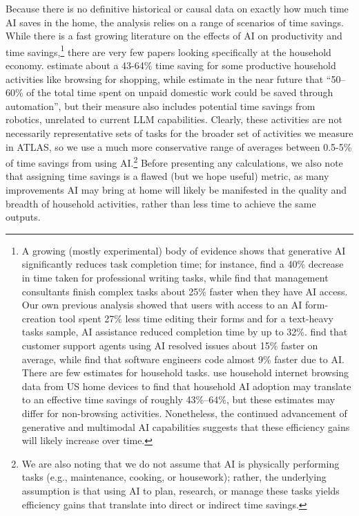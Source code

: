 \documentclass[11pt,a4paper]{article}
\begin{document}
Because there is no definitive historical or causal data on exactly how much time AI saves in the home, the analysis relies on a range of scenarios of time savings. While there is a fast growing literature on the effects of AI on productivity and time savings,\footnote{A growing (mostly experimental) body of evidence shows that generative AI significantly reduces task completion time; for instance, \cite{Noy2023} find a 40\% decrease in time taken for professional writing tasks, while \cite{DellAcqua2026} find that management consultants finish complex tasks about 25\% faster when they have AI access. Our own previous analysis \citep{strand_ai_at_work} showed that users with access to an AI form-creation tool spent 27\% less time editing their forms and for a text-heavy tasks sample, AI assistance reduced completion time by up to 32\%. \cite{Brynjolfsson2025} find that customer support agents using AI resolved issues about 15\% faster on average, while \cite{ChenStratton2026} find that software engineers code almost 9\% faster due to AI. There are few estimates for household tasks. \cite{blank2026householdimpactgenerativeai} use household internet browsing data from US home devices to find that household AI adoption may translate to an effective time savings of roughly 43\%--64\%, but these estimates may differ for non-browsing activities. Nonetheless, the continued advancement of generative and multimodal AI capabilities suggests that these efficiency gains will likely increase over time.} there are very few papers looking specifically at the household economy. \citet{blank2026householdimpactgenerativeai} estimate about a 43-64\% time saving for some productive household activities like browsing for shopping, while \citet{HERTOG2023122443} estimate in the near future that ``50--60\% of the total time spent on unpaid domestic work could be saved through automation'', but their measure also includes potential time savings from robotics, unrelated to current LLM capabilities. Clearly, these activities are not necessarily representative sets of tasks for the broader set of activities we measure in ATLAS, so we use a much more conservative range of averages between 0.5-5\% of time savings from using AI.\footnote{We are also noting that we do not assume that AI is physically performing tasks (e.g., maintenance, cooking, or housework); rather, the underlying assumption is that using AI to plan, research, or manage these tasks yields efficiency gains that translate into direct or indirect time savings.} Before presenting any calculations, we also note that assigning time savings is a flawed (but we hope useful) metric, as many improvements AI may bring at home will likely be manifested in the quality and breadth of household activities, rather than less time to achieve the same outputs.
\end{document}
